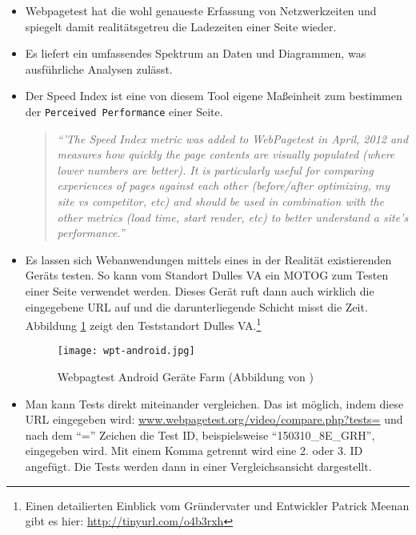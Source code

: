 			\begin{itemize}
				\item Webpagetest hat die wohl genaueste Erfassung von Netzwerkzeiten und spiegelt damit realitätsgetreu die Ladezeiten einer Seite wieder.

				\item Es liefert ein umfassendes Spektrum an Daten und Diagrammen, was ausführliche Analysen zulässt.

				\item Der Speed Index ist eine von diesem Tool eigene Maßeinheit zum bestimmen der \texttt{Perceived Performance} einer Seite. 
				\begin{quote}
					\textit{"`'The Speed Index metric was added to WebPagetest in April, 2012 and measures how quickly the page contents are visually populated (where lower numbers are better).  It is particularly useful for comparing experiences of pages against each other (before/after optimizing, my site vs competitor, etc) and should be used in combination with the other metrics (load time, start render, etc) to better understand a site's performance."'}\autocite[vgl.]{webpagetestDocs}
				\end{quote}

				\item Es lassen sich Webanwendungen mittels eines in der Realität existierenden Geräts testen. So kann vom Standort Dulles VA ein MOTOG zum Testen einer Seite verwendet werden. Dieses Gerät ruft dann auch wirklich die eingegebene URL auf und die darunterliegende Schicht misst die Zeit. Abbildung \ref{fig:wpt-android} zeigt den Teststandort Dulles VA.\footnote{Einen detailierten Einblick vom Gründervater und Entwickler Patrick Meenan gibt es hier: \url{http://tinyurl.com/o4b3rxh}}

				\begin{figure}[htbp]
					\begin{center}
						\texttt{[image: wpt-android.jpg]}
						\caption{Webpagtest Android Geräte Farm (Abbildung von \autocite{meenan15})}
						\label{fig:wpt-android}
					\end{center}
				\end{figure}

				\item Man kann Tests direkt miteinander vergleichen. Das ist möglich, indem diese URL eingegeben wird: \url{www.webpagetest.org/video/compare.php?tests=} und nach dem "`="' Zeichen die Test ID, beispielsweise "`150310\_8E\_GRH"', eingegeben wird.
				Mit einem Komma getrennt wird eine 2. oder 3. ID angefügt. Die Tests werden dann in einer Vergleichsansicht dargestellt.


\end{itemize}
